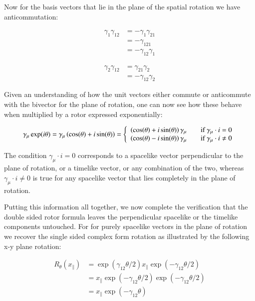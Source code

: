 \documentclass{article}      %
\begin{document}
Now for the basis vectors that lie in the plane of the spatial rotation we have anticommutation:

\begin{align*}
\gamma_{1} \gamma_{12} 
&= -\gamma_{1} \gamma_{21}  \\
&= -\gamma_{121} \\
&= -\gamma_{12} \gamma_{1}
\end{align*}

\begin{align*}
\gamma_{2} \gamma_{12} 
&= \gamma_{21}\gamma_{2} \\
&= -\gamma_{12}\gamma_{2}
\end{align*}

Given an understanding of how the unit vectors either commute or anticommute with the bivector for the plane of rotation, one can now see how these behave when multiplied by a rotor expressed exponentially:

\begin{equation*}
\gamma_{\mu}\exp(i\theta)
= \gamma_{\mu}\left( \cos(\theta) + i\sin(\theta) \right)
=
\left\{ 
\begin{array}{l l}
\left( \cos(\theta) + i\sin(\theta) \right) \gamma_{\mu} & \quad \mbox{if $\gamma_{\mu} \cdot i = 0$} \\
\left( \cos(\theta) - i\sin(\theta) \right) \gamma_{\mu} & \quad \mbox{if $\gamma_{\mu} \cdot i \ne 0$} \\
\end{array} \right.
\end{equation*}

The condition $\gamma_{\mu} \cdot i = 0$ corresponds to a spacelike vector perpendicular to the plane of rotation, or a timelike vector, or any combination of the two, whereas
$\gamma_{\mu} \cdot i \ne 0$ is true for any spacelike vector that lies completely in the plane of rotation.

Putting this information all together, we now complete the verification that the double sided rotor formula leaves the perpendicular spacelike or the timelike components untouched.  For for purely spacelike vectors in the plane of rotation we recover the single sided complex form rotation as illustrated by the following x-y plane rotation:

\begin{align*}
R_{\theta}(x_{\parallel}) 
&= \exp( \gamma_{12}\theta/2) x_{\parallel} \exp( -\gamma_{12}\theta/2) \\
&= x_{\parallel} \exp( -\gamma_{12}\theta/2) \exp( -\gamma_{12}\theta/2) \\
&= x_{\parallel} \exp( -\gamma_{12}\theta) \\
\end{align*}
\end{document}
